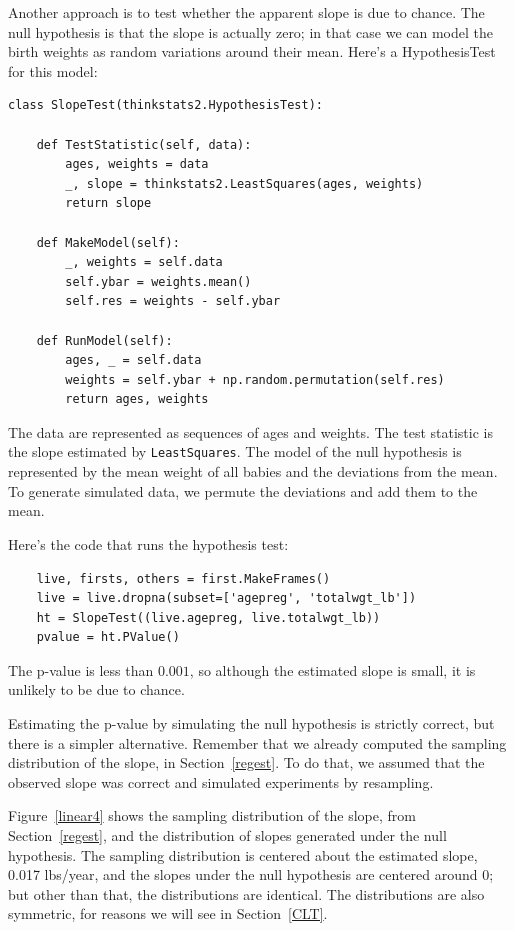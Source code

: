 \documentclass[12pt]{book}
\begin{document}
Another approach is to test whether the apparent slope is due to chance.
The null hypothesis is that the slope is actually zero; in that case
we can model the birth weights as random variations around their mean.
Here's a HypothesisTest for this model:

\begin{verbatim}
class SlopeTest(thinkstats2.HypothesisTest):

    def TestStatistic(self, data):
        ages, weights = data
        _, slope = thinkstats2.LeastSquares(ages, weights)
        return slope

    def MakeModel(self):
        _, weights = self.data
        self.ybar = weights.mean()
        self.res = weights - self.ybar

    def RunModel(self):
        ages, _ = self.data
        weights = self.ybar + np.random.permutation(self.res)
        return ages, weights
\end{verbatim}

The data are represented as sequences of ages and weights.  The
test statistic is the slope estimated by {\tt LeastSquares}.
The model of the null hypothesis is represented by the mean weight
of all babies and the deviations from the mean.  To
generate simulated data, we permute the deviations and add them to
the mean.

Here's the code that runs the hypothesis test:

\begin{verbatim}
    live, firsts, others = first.MakeFrames()
    live = live.dropna(subset=['agepreg', 'totalwgt_lb'])
    ht = SlopeTest((live.agepreg, live.totalwgt_lb))
    pvalue = ht.PValue()
\end{verbatim}

The p-value is less than $0.001$, so although the estimated
slope is small, it is unlikely to be due to chance.

Estimating the p-value by simulating the null hypothesis is strictly
correct, but there is a simpler alternative.  Remember that we already
computed the sampling distribution of the slope, in
Section~\ref{regest}.  To do that, we assumed that the observed slope
was correct and simulated experiments by resampling.

Figure~\ref{linear4} shows the sampling distribution of the
slope, from Section~\ref{regest}, and the distribution of slopes
generated under the null hypothesis.  The sampling distribution
is centered about the estimated slope, 0.017 lbs/year, and the slopes
under the null hypothesis are centered around 0; but other than
that, the distributions are identical.  The distributions are
also symmetric, for reasons we will see in Section~\ref{CLT}.
\end{document}
